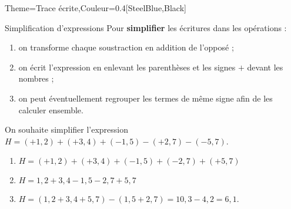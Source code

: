 \begin{Maquette}[Cours]{Theme={Trace écrite},Couleur={0.4[SteelBlue,Black]}}
      \begin{methode*}{Simplification d'expressions}
         Pour {\bf simplifier} les écritures dans les opérations :
         \begin{enumerate}
            \item on transforme chaque soustraction en addition de l'opposé ;
            \item on écrit l'expression en enlevant les parenthèses et les signes $+$ devant les nombres ;
            \item on peut éventuellement regrouper les termes de même signe afin de les calculer ensemble.
         \end{enumerate}
         \begin{exbmethode}
            On souhaite simplifier l'expression $H =(+1,2)+(+3,4)+(-1,5)-(+2,7)-(-5,7)$.
            \tcblower
               \begin{enumerate}
                  \item $H =(+1,2)+(+3,4)+(-1,5)+(-2,7)+(+5,7)$ \par
                  \item $H =1,2+3,4-1,5-2,7+5,7$ \par
                  \item $H =(1,2+3,4+5,7)-(1,5+2,7) =10,3-4,2 =6,1$.
               \end{enumerate}
         \end{exbmethode}
      \end{methode*}

\end{Maquette}


